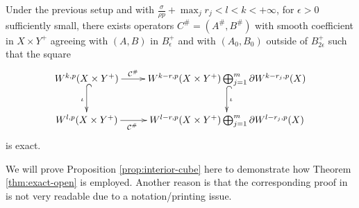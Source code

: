 \begin{proposition}
\label{prop:boundary-cube}
Under the previous setup and with \(\frac{\sigma}{\rho p} + \max_j r_j < l < k < +\infty\), for \(\epsilon > 0\) sufficiently small, there exists operators \(C^\#=(A^\#, B^\#)\)
with smooth coefficient in \(X\times Y^+\) agreeing with \((A,B)\) in \(B^+_\epsilon\) and with \((A_0,B_0)\) outside of \(B^+_{2\epsilon}\) such that the square
\[
 \xymatrix{
W^{k,p}(X\times Y^+) \ar@{->}[r]^<<<<<{\mathcal{C}^\#} \ar@{^{(}->}[d]_{\iota} & W^{k-r,p}(X\times Y^+)\bigoplus_{j=1}^m \partial W^{k-r_j,p}(X) \ar@{^{(}->}[d]^{\iota} \\
W^{l,p}(X\times Y^+) \ar@{->}[r]_<<<<<{\mathcal{C}^\#} & W^{l-r,p}(X\times Y^+)\bigoplus_{j=1}^m \partial W^{l-r_j,p}(X) 
}
\]
is exact.
\end{proposition}

We will prove Proposition \ref{prop:interior-cube} here to demonstrate how Theorem
\ref{thm:exact-open} is employed. Another reason is that the corresponding proof in
\cite{hamilton_harmonic_1975} is not very readable due to a notation/printing issue.

